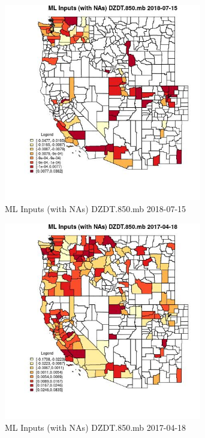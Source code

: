 \begin{figure} 
\centering  
\includegraphics[width=0.77\textwidth]{Code_Outputs/Report_ML_input_PM25_Step4_part_e_de_duplicated_aves_compiled_2019-05-21wNAs_CountyDZDT850mbMean2018-07-15.jpg} 
\caption{\label{fig:Report_ML_input_PM25_Step4_part_e_de_duplicated_aves_compiled_2019-05-21wNAsCountyDZDT850mbMean2018-07-15}ML Inputs (with NAs) DZDT.850.mb 2018-07-15} 
\end{figure} 
 

\begin{figure} 
\centering  
\includegraphics[width=0.77\textwidth]{Code_Outputs/Report_ML_input_PM25_Step4_part_e_de_duplicated_aves_compiled_2019-05-21wNAs_CountyDZDT850mbMean2017-04-18.jpg} 
\caption{\label{fig:Report_ML_input_PM25_Step4_part_e_de_duplicated_aves_compiled_2019-05-21wNAsCountyDZDT850mbMean2017-04-18}ML Inputs (with NAs) DZDT.850.mb 2017-04-18} 
\end{figure} 
 

